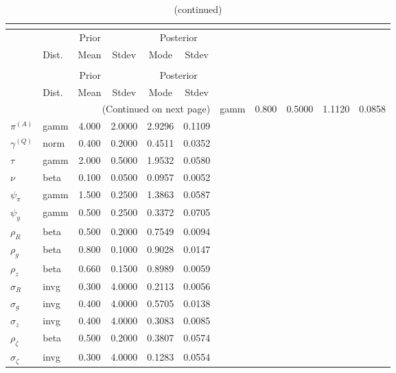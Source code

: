 
\begin{center}
\begin{longtable}{llcccc} 
\caption{Results from posterior maximization (parameters)}\\
 \label{Table:Posterior:1}\\
\toprule 
  & \multicolumn{3}{c}{Prior}  &  \multicolumn{2}{c}{Posterior} \\
  \cmidrule(r{.75em}){2-4} \cmidrule(r{.75em}){5-6}
  & Dist. & Mean  & Stdev & Mode & Stdev \\ 
\midrule \endfirsthead 
\caption{(continued)}\\
 \bottomrule 
  & \multicolumn{3}{c}{Prior}  &  \multicolumn{2}{c}{Posterior} \\
  \cmidrule(r{.75em}){2-4} \cmidrule(r{.75em}){5-6}
  & Dist. & Mean  & Stdev & Mode & Stdev \\ 
\midrule \endhead 
\bottomrule \multicolumn{6}{r}{(Continued on next page)}\endfoot 
\bottomrule\endlastfoot 
${r_{A}}$ & gamm &   0.800 & 0.5000 &   1.1120 &  0.0858 \\ 
${\pi^{(A)}}$ & gamm &   4.000 & 2.0000 &   2.9296 &  0.1109 \\ 
${\gamma^{(Q)}}$ & norm &   0.400 & 0.2000 &   0.4511 &  0.0352 \\ 
${\tau}$ & gamm &   2.000 & 0.5000 &   1.9532 &  0.0580 \\ 
${\nu}$ & beta &   0.100 & 0.0500 &   0.0957 &  0.0052 \\ 
${\psi_\pi}$ & gamm &   1.500 & 0.2500 &   1.3863 &  0.0587 \\ 
${\psi_y}$ & gamm &   0.500 & 0.2500 &   0.3372 &  0.0705 \\ 
${\rho_R}$ & beta &   0.500 & 0.2000 &   0.7549 &  0.0094 \\ 
${\rho_{g}}$ & beta &   0.800 & 0.1000 &   0.9028 &  0.0147 \\ 
${\rho_z}$ & beta &   0.660 & 0.1500 &   0.8989 &  0.0059 \\ 
${\sigma_R}$ & invg &   0.300 & 4.0000 &   0.2113 &  0.0056 \\ 
${\sigma_{g}}$ & invg &   0.400 & 4.0000 &   0.5705 &  0.0138 \\ 
${\sigma_z}$ & invg &   0.400 & 4.0000 &   0.3083 &  0.0085 \\ 
${\rho_\zeta}$ & beta &   0.500 & 0.2000 &   0.3807 &  0.0574 \\ 
${\sigma_\zeta}$ & invg &   0.300 & 4.0000 &   0.1283 &  0.0554 \\ 
\end{longtable}
 \end{center}

